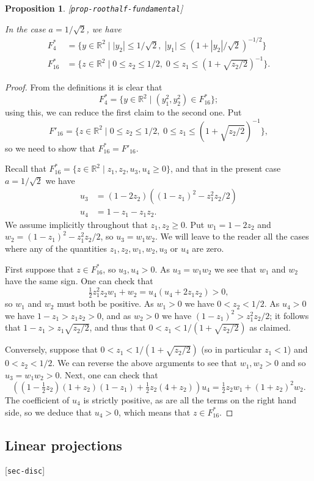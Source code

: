 \documentclass[reqno]{amsart}
\newcommand{\lbl}[1]{\label{#1}\textup{[\texttt{#1}]}\par}
\newcommand{\lbl}{\label}
\newcommand{\R}         {{\mathbb{R}}}
\newcommand{\st}        {\;|\;}
\newcommand{\half}      {\tfrac{1}{2}}
\newcommand{\rt}        {\sqrt{2}}
\renewcommand{\:}{\colon}
\newtheorem{proposition}[theorem]{Proposition}
\theoremstyle{definition}
\begin{document}
\begin{proposition}\lbl{prop-roothalf-fundamental}
 In the case $a=1/\rt$, we have
 \begin{align*}
  F_4^* &= \{y\in\R^2\st |y_2|\leq 1/\rt,\;
             |y_1|\leq (1+|y_2|/\rt)^{-1/2}\} \\
  F_{16}^* &= \{z\in \R^2\st 0\leq z_2\leq 1/2,\;
                0\leq z_1\leq (1+\sqrt{z_2/2})^{-1}\}.
 \end{align*}
\end{proposition}
\begin{proof}
 From the definitions it is clear that
 \[ F_4^*=\{y\in\R^2 \st (y_1^2,y_2^2)\in F_{16}^*\}; \]
 using this, we can reduce the first claim to the second one.  Put
 \[ F'_{16} = \{z\in \R^2\st 0\leq z_2\leq 1/2,\;
                0\leq z_1\leq (1+\sqrt{z_2/2})^{-1}\},
 \]
 so we need to show that $F^*_{16}=F'_{16}$.

 Recall that $F_{16}^*=\{z\in\R^2\st z_1,z_2,u_3,u_4\geq 0\}$, and
 that in the present case $a=1/\rt$ we have
 \begin{align*}
  u_3 &= (1-2z_2)((1-z_1)^2-z_1^2z_2/2) \\
  u_4 &= 1-z_1-z_1z_2.
 \end{align*}
 We assume implicitly throughout that $z_1,z_2\geq 0$.  Put
 $w_1=1-2z_2$ and $w_2=(1-z_1)^2-z_1^2z_2/2$, so $u_3=w_1w_2$.  We
 will leave to the reader all the cases where any of the quantities
 $z_1,z_2,w_1,w_2,u_3$ or $u_4$ are zero.

 First suppose that $z\in F^*_{16}$, so $u_3,u_4>0$.  As
 $u_3=w_1w_2$ we see that $w_1$ and $w_2$ have the same sign.
 One can check that
 \[ \half z_1^2z_2w_1 + w_2 = u_4(u_4+2z_1z_2) > 0, \]
 so $w_1$ and $w_2$ must both be positive.  As $w_1>0$ we have
 $0<z_2<1/2$.  As $u_4>0$ we have $1-z_1>z_1z_2>0$, and as $w_2>0$ we
 have $(1-z_1)^2>z_1^2z_2/2$; it follows that $1-z_1>z_1\sqrt{z_2/2}$,
 and thus that $0<z_1<1/(1+\sqrt{z_2/2})$ as claimed.

 Conversely, suppose that $0<z_1<1/(1+\sqrt{z_2/2})$ (so in particular
 $z_1<1$) and $0<z_2<1/2$.  We can reverse the above arguments to see
 that $w_1,w_2>0$ and so $u_3=w_1w_2>0$.  Next, one can check that
 \[ ((1-\half z_2)(1+z_2)(1-z_1)+\half z_2(4+z_2))u_4 =
     \half z_2 w_1 + (1+z_2)^2 w_2.
 \]
 The coefficient of $u_4$ is strictly positive, as are all the terms
 on the right hand side, so we deduce that $u_4>0$, which means that
 $z\in F^*_{16}$.
\end{proof}

\subsection{Linear projections}
\lbl{sec-disc}
\end{document}
